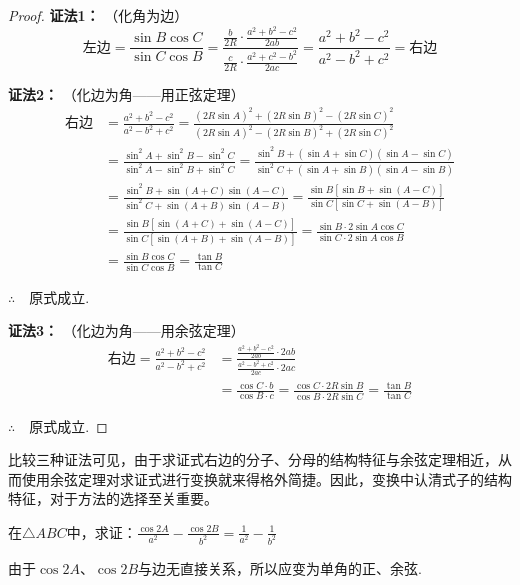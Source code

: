 \begin{proof}
\textbf{证法1：} （化角为边）
\[
\text{左边}=\frac{\sin B\cos C}{\sin C\cos B}=\frac{\frac{b}{2R}\cdot \frac{a^2+b^2-c^2}{2ab}}{\frac{c}{2R}\cdot \frac{a^2+c^2-b^2}{2ac}}=\frac{a^2+b^2-c^2}{a^2-b^2+c^2}=\text{右边}
\]

\textbf{证法2：} （化边为角——用正弦定理）
\[\begin{split}
\text{右边}&=\frac{a^2+b^2-c^2}{a^2-b^2+c^2}=\frac{(2R\sin A)^2+(2R\sin B)^2-(2R\sin C)^2}{(2R\sin A)^2-(2R\sin B)^2+(2R\sin C)^2}\\
&=\frac{\sin^2 A+\sin^2 B-\sin^2 C}{\sin^2 A-\sin^2 B+\sin^2 C}=\frac{\sin^{2}B+\left(\sin A+\sin C\right)\left(\sin A-\sin C\right)}{\sin^{2}C+\left(\sin A+\sin B\right)\left(\sin A-\sin B\right)}\\
&=\frac{\sin^{2}B+\sin\left(A+C\right)\sin\left(A-C\right)}{\sin^{2}C+\sin\left(A+B\right)\sin\left(A-B\right)}=\frac{\sin B[\sin B+\sin(A-C)]}{\sin C[\sin C+\sin(A-B)]}\\
&=\frac{\sin B[\sin(A+C)+\sin(A-C)]}{\sin C[\sin(A+B)+\sin(A-B)]}
=\frac{\sin B\cdot 2\sin A\cos C}{\sin C\cdot 2\sin A\cos B}\\
&=\frac{\sin B\cos C}{\sin C\cos B}=\frac{\tan B}{\tan C}
\end{split}\]

$\therefore\quad $原式成立.

\textbf{证法3：} （化边为角——用余弦定理）
\[\begin{split}
\text{右边}=\frac{a^2+b^2-c^2}{a^2-b^2+c^2}&=\frac{\frac{a^2+b^2-c^2}{2ab}\cdot 2ab}{\frac{a^2-b^2+c^2}{2ac}\cdot 2ac}\\
&=\frac{\cos C\cdot b}{\cos B\cdot c}=\frac{\cos C\cdot 2R\sin B}{\cos B\cdot 2R\sin C}=\frac{\tan B}{\tan C}
\end{split}\]

$\therefore\quad $原式成立.
\end{proof}

\begin{remark}
比较三种证法可见，由于求证式右边的分子、分母的结构特征与余弦定理相近，从而使用余弦定理对求证式进行变换就来得格外简捷。因此，变换中认清式子的结构特征，对于方法的选择至关重要。
\end{remark}


\begin{example}
    在$\triangle ABC$中，求证：$\frac{\cos 2A}{a^2}-\frac{\cos 2B}{b^2}=\frac{1}{a^2}-\frac{1}{b^2}$
\end{example}

\begin{analyze}
    由于$\cos 2A$、$\cos 2B$与边无直接关系，所以应变为单角的正、余弦.
\end{analyze}

